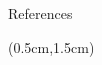 \documentclass{beamer}
\theoremstyle{definition}
\begin{document}
\begin{frame}{References}
    
    \begin{textblock*}{12cm}(0.5cm,1.5cm)

        
    \end{textblock*}
        

\end{frame}




 

\end{document}
